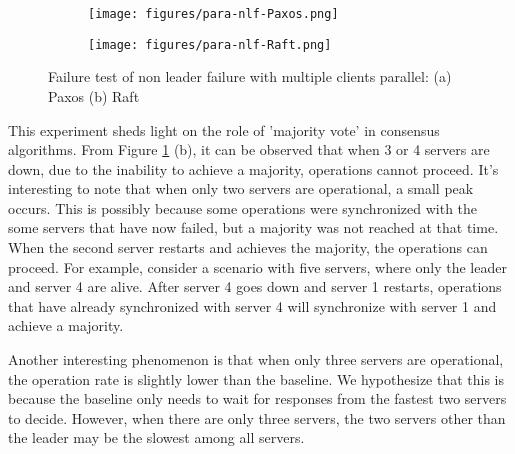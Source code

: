 \documentclass[11pt,a4paper]{article}
\begin{document}
\begin{figure}[!ht]
    \begin{subfigure}{0.49\textwidth}
        \texttt{[image: figures/para-nlf-Paxos.png]}
        \caption{}
    \end{subfigure}
    \begin{subfigure}{0.49\textwidth}
        \texttt{[image: figures/para-nlf-Raft.png]}
        \caption{}
    \end{subfigure}
    \caption{Failure test of non leader failure with multiple clients parallel: (a) Paxos (b) Raft}
    \label{fig:failure_NonLeaderFailure_MultipleClientsParallel}
\end{figure}

This experiment sheds light on the role of 'majority vote' in consensus algorithms. From Figure \ref{fig:failure_NonLeaderFailure_MultipleClientsParallel} (b), it can be observed that when 3 or 4 servers are down, due to the inability to achieve a majority, operations cannot proceed. It's interesting to note that when only two servers are operational, a small peak occurs. This is possibly because some operations were synchronized with the some servers that have now failed, but a majority was not reached at that time. When the second server restarts and achieves the majority, the operations can proceed. For example, consider a scenario with five servers, where only the leader and server 4 are alive. After server 4 goes down and server 1 restarts, operations that have already synchronized with server 4 will synchronize with server 1 and achieve a majority.

Another interesting phenomenon is that when only three servers are operational, the operation rate is slightly lower than the baseline. We hypothesize that this is because the baseline only needs to wait for responses from the fastest two servers to decide. However, when there are only three servers, the two servers other than the leader may be the slowest among all servers.


\end{document}
